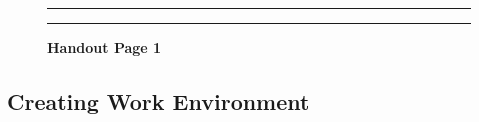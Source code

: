 \documentclass[]{article}
\begin{document}
\begin{figure}[!ht]
    \hrule
    \caption{ \textbf{Handout Page 1} }
    \begin{center}
    \end{center}
    \label{fig:handout}
    \hrule
\end{figure}

\newpage

\subsection{Creating Work Environment}
\label{sec:appendix-setup}
\end{document}

